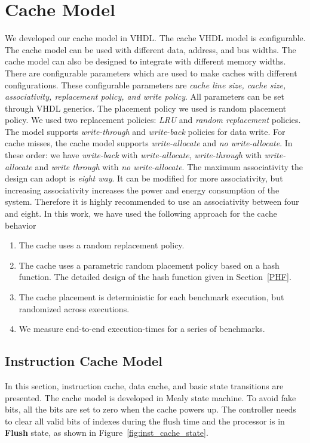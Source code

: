 \section{Cache Model}

We developed our cache model in VHDL. The cache VHDL model is configurable. The cache model can be used with different data, address, and  bus widths. The cache model can also be designed to integrate with different memory widths. There are  configurable parameters which are used to make caches with different configurations. These configurable parameters are \textit{cache line size, cache size, associativity, replacement policy, and write policy}. All parameters can be set through VHDL generics. The placement policy we used is random placement policy. We used two replacement policies: \textit{LRU} and \textit {random replacement} policies. The model supports \textit{write-through} and \textit{write-back} policies for data write. For cache misses, the cache model supports \textit{write-allocate} and \textit{no write-allocate}. In these order: we have \textit{write-back} with \textit {write-allocate}, \textit{write-through} with \textit{write-allocate}  and \textit{write through} with \textit{no write-allocate}. The maximum associativity the design can adopt is \textit{eight way}. It can be modified for more associativity, but increasing associativity increases the power and energy consumption of the system. Therefore it is highly recommended to use an associativity between four and eight. In this work, we have
used the following approach for the cache behavior
\begin{enumerate}
\item The cache uses a random replacement policy.
\item The cache uses a parametric random placement policy based on
 a hash function. The detailed design of the hash function given in Section~\ref{PHF}.
\item The cache placement is deterministic for each benchmark execution, but
  randomized across executions.
\item We measure end-to-end execution-times for a series of benchmarks.
\end{enumerate}



\subsection{Instruction Cache Model}
In this section, instruction cache, data cache, and basic state transitions are presented. The cache model is developed in Mealy state machine. To avoid fake bits, all the bits are set to zero when the cache powers up. The controller needs to clear all valid bits of indexes during the flush time and the processor is in \textbf{Flush} state, as shown in Figure~\ref{fig:inst_cache_state}.

